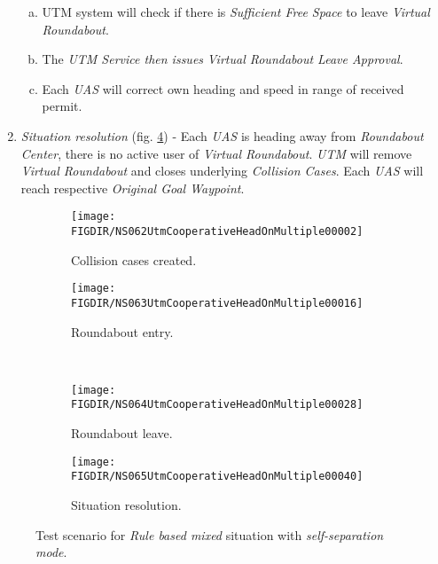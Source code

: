 \begin{enumerate}
\begin{enumerate}[a.]
		\item UTM system will check if there is \emph{Sufficient Free Space} to leave \emph{Virtual Roundabout}.
		
		\item The \emph{UTM Service then issues} \emph{Virtual Roundabout Leave Approval}.
		
		\item Each \emph{UAS} will correct own heading and speed in range of received permit.
	\end{enumerate}   
	
	\item \emph{Situation resolution} (fig. \ref{fig:ruleMultipleSituationResolution}) - Each \emph{UAS} is heading away from \emph{Roundabout Center}, there is no active user of \emph{Virtual Roundabout}. \emph{UTM} will remove \emph{Virtual Roundabout}  and closes underlying \emph{Collision Cases}. Each \emph{UAS} will reach respective \emph{Original Goal Waypoint}.
\end{enumerate}


\begin{figure}[H]
	\centering
	\begin{subfigure}{0.48\textwidth}
		\centering
		\texttt{[image: \\FIGDIR/NS062UtmCooperativeHeadOnMultiple00002]}
		\caption{Collision cases created.}
		\label{fig:ruleMultipleCollisionCasesCreated}
	\end{subfigure}
	\begin{subfigure}{0.48\textwidth}
		\centering
		\texttt{[image: \\FIGDIR/NS063UtmCooperativeHeadOnMultiple00016]} 
		\caption{Roundabout entry.}
		\label{fig:ruleMultipleRoundabountEntry}
	\end{subfigure}
	\\
	\begin{subfigure}{0.48\textwidth}
		\centering
		\texttt{[image: \\FIGDIR/NS064UtmCooperativeHeadOnMultiple00028]} 
		\caption{Roundabout leave.}
		\label{fig:ruleMultipleRoundaboutLeave}
	\end{subfigure}
	\begin{subfigure}{0.48\textwidth}
		\centering
		\texttt{[image: \\FIGDIR/NS065UtmCooperativeHeadOnMultiple00040]} 
		\caption{Situation resolution.}
		\label{fig:ruleMultipleSituationResolution}
	\end{subfigure}
	\caption{Test scenario for \emph{Rule based mixed} situation with \emph{self-separation mode}.}
	\label{fig:testCaseRuleBasedMixed}
\end{figure}

